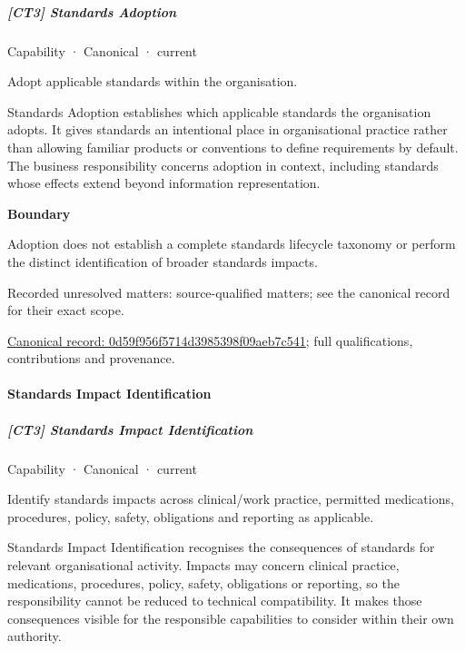 \subparagraph{[CT3] Standards Adoption}

\label{element:0d59f956f5714d3985398f09aeb7c541}
{\small Capability · Canonical · current}\par

Adopt applicable standards within the organisation.



Standards Adoption establishes which applicable standards the organisation adopts. It gives standards an intentional place in organisational practice rather than allowing familiar products or conventions to define requirements by default. The business responsibility concerns adoption in context, including standards whose effects extend beyond information representation.



\textbf{Boundary}



Adoption does not establish a complete standards lifecycle taxonomy or perform the distinct identification of broader standards impacts.


{\small Recorded unresolved matters: source-qualified matters; see the canonical record for their exact scope.}\par
{\footnotesize \href{../../../../continuum/strategy/capability/0d59f956f5714d3985398f09aeb7c541.md}{Canonical record: 0d59f956f5714d3985398f09aeb7c541}; full qualifications, contributions and provenance.}\par
\paragraph{Standards Impact Identification}

\subparagraph{[CT3] Standards Impact Identification}

\label{element:6b9c96c7d9174e7fbfd11267673d42f3}
{\small Capability · Canonical · current}\par

Identify standards impacts across clinical/work practice, permitted medications, procedures, policy, safety, obligations and reporting as applicable.



Standards Impact Identification recognises the consequences of standards for relevant organisational activity. Impacts may concern clinical practice, medications, procedures, policy, safety, obligations or reporting, so the responsibility cannot be reduced to technical compatibility. It makes those consequences visible for the responsible capabilities to consider within their own authority.



